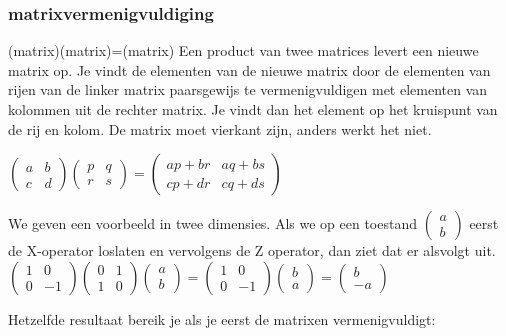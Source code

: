 \documentclass[../../main.tex]{subfiles}
\begin{document}
\subsubsection{matrixvermenigvuldiging}
(matrix)(matrix)=(matrix)
Een product van twee matrices levert een nieuwe matrix op. Je vindt de elementen van de nieuwe matrix door de elementen van rijen van de linker matrix paarsgewijs te vermenigvuldigen met elementen van kolommen uit de rechter matrix. Je vindt dan het element op het kruispunt van de rij en kolom. De matrix moet vierkant zijn, anders werkt het niet.


$
\begin{pmatrix}
a&b\\
c&d
\end{pmatrix}
\begin{pmatrix}
p&q\\
r&s
\end{pmatrix}
=
\begin{pmatrix}
ap+br&aq+bs\\
cp+dr&cq+ds
\end{pmatrix}
$

We geven een voorbeeld in twee dimensies. 
Als we op een toestand $\begin{pmatrix}
a\\
b
\end{pmatrix}$
eerst de X-operator loslaten en vervolgens de Z operator, dan ziet dat er alsvolgt uit.
$
\begin{pmatrix}
1&0\\
0&-1
\end{pmatrix}
\begin{pmatrix}
0&1\\
1&0
\end{pmatrix}
\begin{pmatrix}
a\\
b
\end{pmatrix}
=
\begin{pmatrix}
1&0\\
0&-1
\end{pmatrix}
\begin{pmatrix}
b\\
a
\end{pmatrix}
=
\begin{pmatrix}
b\\
-a
\end{pmatrix}
$

Hetzelfde resultaat bereik je als je eerst de matrixen vermenigvuldigt: 
\end{document}

